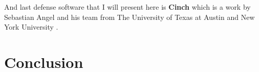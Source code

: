 And last defense software that I will present here is \textbf{Cinch} which is a work by Sebastian Angel and his team from The University of Texas at Austin and New York University \cite{197175}.



\chapter{Conclusion}
\label{conclusion}
